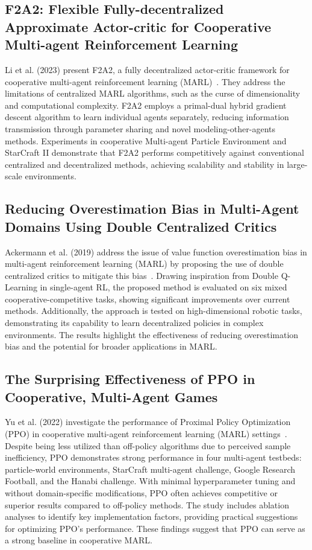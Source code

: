 \documentclass[journal]{IEEEtran}
\begin{document}
\subsection{F2A2: Flexible Fully-decentralized Approximate Actor-critic for Cooperative 
Multi-agent Reinforcement Learning} %
Li et al. (2023) present F2A2, a fully decentralized actor-critic framework for cooperative 
multi-agent reinforcement learning (MARL)~\cite{li2023d}. They address the limitations of 
centralized MARL algorithms, such as the curse of dimensionality and computational complexity. 
F2A2 employs a primal-dual hybrid gradient descent algorithm to learn individual agents separately,
reducing information transmission through parameter sharing and novel modeling-other-agents 
methods. Experiments in cooperative Multi-agent Particle Environment and StarCraft II demonstrate 
that F2A2 performs competitively against conventional centralized and decentralized methods, 
achieving scalability and stability in large-scale environments.

\subsection{Reducing Overestimation Bias in Multi-Agent Domains Using Double Centralized Critics} 
Ackermann et al. (2019) address the issue of value function overestimation bias in multi-agent 
reinforcement learning (MARL) by proposing the use of double centralized critics to mitigate 
this bias~\cite{ackermann2019}. Drawing inspiration from Double Q-Learning in single-agent RL, 
the proposed method is evaluated on six mixed cooperative-competitive tasks, 
showing significant improvements over current methods. 
Additionally, the approach is tested on high-dimensional robotic tasks, 
demonstrating its capability to learn decentralized policies in complex environments. 
The results highlight the effectiveness of reducing overestimation bias and the potential for 
broader applications in MARL.

\subsection{The Surprising Effectiveness of PPO in Cooperative, Multi-Agent Games} 
Yu et al. (2022) investigate the performance of Proximal Policy Optimization (PPO) 
in cooperative multi-agent reinforcement learning (MARL) settings~\cite{yu2022}. 
Despite being less utilized than off-policy algorithms due to perceived sample inefficiency, 
PPO demonstrates strong performance in four multi-agent testbeds: particle-world environments, 
StarCraft multi-agent challenge, Google Research Football, and the Hanabi challenge. 
With minimal hyperparameter tuning and without domain-specific modifications, 
PPO often achieves competitive or superior results compared to off-policy methods. 
The study includes ablation analyses to identify key implementation factors, 
providing practical suggestions for optimizing PPO's performance. 
These findings suggest that PPO can serve as a strong baseline in cooperative MARL.
\end{document}
